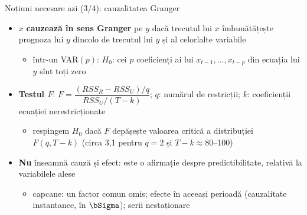 \begin{frame}{Noțiuni necesare azi (3/4): cauzalitatea Granger}
\itemsize{\small}
\begin{itemize}
    \item $x$ \textbf{cauzează în sens Granger} pe $y$ dacă trecutul lui $x$ îmbunătățește prognoza lui $y$ dincolo de trecutul lui $y$ și al celorlalte variabile
    \begin{itemize}
        \item într-un VAR$(p)$: $H_0$: cei $p$ coeficienți ai lui $x_{t-1}, \dots, x_{t-p}$ din ecuația lui $y$ sînt toți zero
    \end{itemize}
    \item \textbf{Testul $F$}: $F = \dfrac{(RSS_R - RSS_U)/q}{RSS_U/(T - k)}$; $q$: numărul de restricții; $k$: coeficienții ecuației nerestricționate
    \begin{itemize}
        \item respingem $H_0$ dacă $F$ depășește valoarea critică a distribuției $F(q, T - k)$ (circa 3,1 pentru $q = 2$ și $T - k \approx 80$--100)
    \end{itemize}
    \item \textbf{Nu} înseamnă cauză și efect: este o afirmație despre predictibilitate, relativă la variabilele alese
    \begin{itemize}
        \item capcane: un factor comun omis; efecte în aceeași perioadă (cauzalitate instantanee, în $\bSigma$); serii nestaționare
    \end{itemize}
\end{itemize}
\end{frame}

